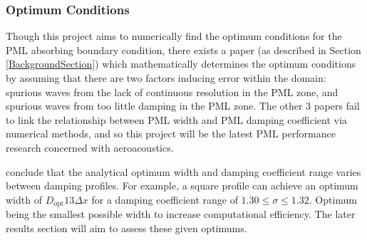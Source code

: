 \subsubsection{Optimum Conditions} \label{OptimumCondSection}

Though this project aims to numerically find the optimum conditions for the PML absorbing boundary condition, there exists a paper \cite{choung2018nonreflective} (as described in Section \ref{BackgroundSection}) which mathematically determines the optimum conditions by assuming that there are two factors inducing error within the domain: spurious waves from the lack of continuous resolution in the PML zone, and spurious waves from too little damping in the PML zone. The other 3 papers \cite{margengo1999optimumpml} \cite{li2003optimizationPML} \cite{agrawal2004pmlperformance} fail to link the relationship between PML width and PML damping coefficient via numerical methods, and so this project will be the latest PML performance research concerned with aeroacoustics.

\textcite{choung2018nonreflective} conclude that the analytical optimum width and damping coefficient range varies between damping profiles. For example, a square profile can achieve an optimum width of $D_{\mathrm{opt}} 13 \Delta x$ for a damping coefficient range of $1.30 \leq \sigma \leq 1.32$. Optimum being the smallest possible width to increase computational efficiency. The later results section will aim to assess these given optimums.
